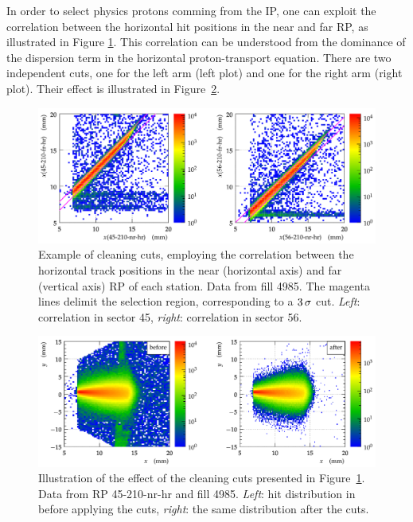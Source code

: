 \documentclass[TOTEM]{cern/cernphprep}
\def\un#1{\,{\rm #1}}
\begin{document}
In order to select physics protons comming from the IP, one can exploit the correlation between the horizontal hit positions in the near and far RP, as illustrated in Figure \ref{fig:hor_cuts}. This correlation can be understood from the dominance of the dispersion term in the horizontal proton-transport equation. There are two independent cuts, one for the left arm (left plot) and one for the right arm (right plot). Their effect is illustrated in Figure~\ref{fig:hor_cuts_effect}.

\begin{figure}[h!]
\begin{center}
\includegraphics[width=0.7\hsize]{fig/physics_fills/hor_cuts.pdf}
\caption{%
Example of cleaning cuts, employing the correlation between the horizontal track positions in the near (horizontal axis) and far (vertical axis) RP of each station. Data from fill 4985. The magenta lines delimit the selection region, corresponding to a $3\un{\sigma}$ cut. {\it Left}: correlation in sector 45, {\it right}: correlation in sector 56.
}
\label{fig:hor_cuts}
\end{center}
\end{figure}


\begin{figure}[h!]
\begin{center}
\includegraphics[width=0.7\hsize]{fig/physics_fills/hor_cuts_effect_cmp.pdf}
\caption{%
Illustration of the effect of the cleaning cuts presented in Figure~\ref{fig:hor_cuts}. Data from RP 45-210-nr-hr and fill 4985. {\it Left}: hit distribution in before applying the cuts, {\it right}: the same distribution after the cuts.
}
\label{fig:hor_cuts_effect}
\end{center}
\end{figure}
\end{document}
